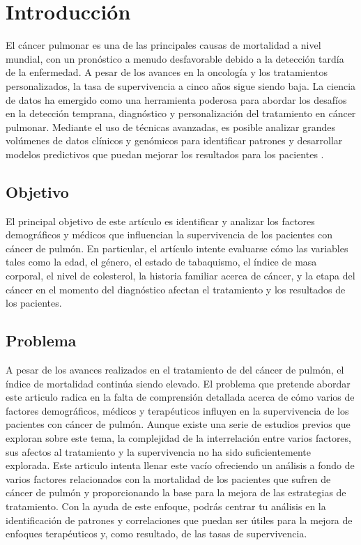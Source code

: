 \documentclass[10pt,journal,compsoc]{IEEEtran}
\begin{document}
\section{Introducción}
\label{sec:introduction}
\fi

 El cáncer pulmonar es una de las principales causas de mortalidad a nivel mundial, con un pronóstico a menudo desfavorable debido a la detección tardía de la enfermedad. A pesar de los avances en la oncología y los tratamientos personalizados, la tasa de supervivencia a cinco años sigue siendo baja. La ciencia de datos ha emergido como una herramienta poderosa para abordar los desafíos en la detección temprana, diagnóstico y personalización del tratamiento en cáncer pulmonar. Mediante el uso de técnicas avanzadas, es posible analizar grandes volúmenes de datos clínicos y genómicos para identificar patrones y desarrollar modelos predictivos que puedan mejorar los resultados para los pacientes .

\subsection{Objetivo}
El principal objetivo de este artículo es identificar y analizar los factores demográficos y médicos que influencian la supervivencia de los pacientes con cáncer de pulmón. En particular, el artículo intente evaluarse cómo las variables tales como la edad, el género, el estado de tabaquismo, el índice de masa corporal, el nivel de colesterol, la historia familiar acerca de cáncer, y la etapa del cáncer en el momento del diagnóstico afectan el tratamiento y los resultados de los pacientes.

\subsection{Problema}
A pesar de los avances realizados en el tratamiento de del cáncer de pulmón, el índice de mortalidad continúa siendo elevado. El problema que pretende abordar este articulo radica en la falta de comprensión detallada acerca de cómo varios de factores demográficos, médicos y terapéuticos influyen en la supervivencia de los pacientes con cáncer de pulmón. Aunque existe una serie de estudios previos que exploran sobre este tema, la complejidad de la interrelación entre varios factores, sus afectos al tratamiento y la supervivencia no ha sido suficientemente explorada. Este articulo intenta llenar este vacío ofreciendo un análisis a fondo de varios factores relacionados con la mortalidad de los pacientes que sufren de cáncer de pulmón y proporcionando la base para la mejora de las estrategias de tratamiento. Con la ayuda de este enfoque, podrás centrar tu análisis en la identificación de patrones y correlaciones que puedan ser útiles para la mejora de enfoques terapéuticos y, como resultado, de las tasas de supervivencia.
\end{document}
